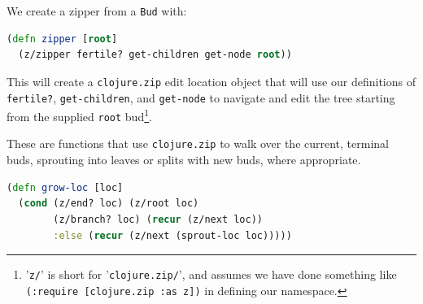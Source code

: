 \documentclass[11pt,openany,american,usenames,dvipsnames,svgnames,x11names,table,isodate]{article}
\numberwithin{equation}{section}
\numberwithin{figure}{section}
\begin{document}
We create a zipper from a \texttt{Bud} with:

\begin{minipage}[t]{1\columnwidth}%
\begin{lstlisting}[caption={Create a zipper for growing a tree},label={lis:zipper},language=clojure,tabsize=2]
(defn zipper [root] 
  (z/zipper fertile? get-children get-node root)) 
\end{lstlisting}
%
\end{minipage}

This will create a \texttt{clojure.zip} edit location object that
will use our definitions of \texttt{fertile?}, \texttt{get-children},
and \texttt{get-node} to navigate and edit the tree starting from
the supplied \texttt{root} bud\footnote{'\texttt{z/}' is short for '\texttt{clojure.zip/}', and assumes we
have done something like \texttt{(:require~{[}clojure.zip~:as~z{]})}
in defining our namespace.}. 

These are functions that use \texttt{clojure.zip} to walk over the
current, terminal buds, sprouting into leaves or splits with new buds,
where appropriate.

\begin{minipage}[t]{1\columnwidth}%
\begin{lstlisting}[caption={Growing a tree using a zipper},label={lis:grow-loc},language=clojure,tabsize=2]
(defn grow-loc [loc]
  (cond (z/end? loc) (z/root loc)
        (z/branch? loc) (recur (z/next loc))
        :else (recur (z/next (sprout-loc loc))))) 
\end{lstlisting}
%
\end{minipage}
\end{document}

